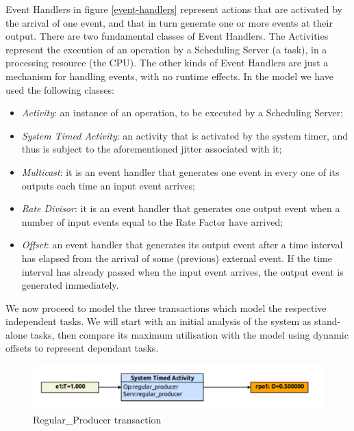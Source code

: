 \documentclass{article}
\begin{document}
Event Handlers in figure \ref{event-handlers} represent actions that are activated by the arrival of one event, and that in turn generate one or more events at their output. There are two fundamental classes of Event Handlers. The Activities represent the execution of an operation by a Scheduling Server (a task), in a processing resource (the CPU). The other kinds of Event Handlers are just a mechanism for handling events, with no runtime effects. In the model we have used the following classes:

\begin{itemize}
   \item \textit{Activity}: an instance of an operation, to be executed by a Scheduling Server;
   \item \textit{System Timed Activity}: an activity that is activated by the system timer, and thus is subject to the aforementioned jitter associated with it;
   \item \textit{Multicast}: it is an event handler that generates one event in every one of its outputs each time an input event arrives;
   \item \textit{Rate Divisor}: it is an event handler that generates one output event when a number of input events equal to the Rate Factor have arrived;
   \item \textit{Offset}: an event handler that generates its output event after a time interval has elapsed from the arrival of some (previous) external event. If the time interval has already passed when the input event arrives, the output event is generated immediately.
\end{itemize}

We now proceed to model the three transactions which model the respective independent tasks. We will start with an initial analysis of the system as stand-alone tasks, then compare its maximum utilisation with the model using dynamic offsets to represent dependant tasks.

\begin{figure}[!htbp]
\centering
\includegraphics[width=5in]{images/transaction-rp}
\caption{Regular\_Producer transaction}
\label{transaction-rp}
\end{figure}
\end{document}
